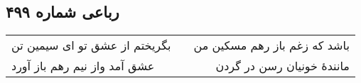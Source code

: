 \begin{center}
\section*{رباعی شماره ۴۹۹}
\label{sec:sh499}
\begin{longtable}{l p{0.5cm} r}
بگریختم از عشق تو ای سیمین تن
&&
باشد که زغم باز رهم مسکین من
\\
عشق آمد واز نیم رهم باز آورد
&&
مانندهٔ خونیان رسن در گردن
\\
\end{longtable}
\end{center}
